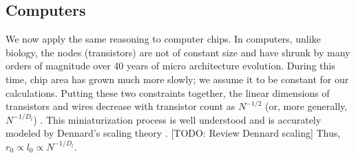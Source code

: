 \documentclass[12pt]{article}
\begin{document}
\subsection{Computers}
\label{sec:computers}

We now apply the same reasoning to computer chips. 
In computers, unlike biology, the nodes (transistors) 
are not of constant size and have shrunk by many orders of magnitude over
40 years of micro architecture evolution.  During this time,
chip area has grown much more slowly; we assume it to be constant for our calculations.
Putting these two constraints together, the linear 
dimensions of transistors and wires decrease with transistor count as 
$N^{-1/2}$ (or, more generally, $N^{-1/D_l}$) \cite{moses08}.  This 
miniaturization process is well understood and is accurately modeled 
by Dennard's scaling theory \cite{dennard74}.  [TODO: Review Dennard scaling]  
Thus, $r_0 \propto l_0 \propto N^{-1/D_l}$.
\end{document}
